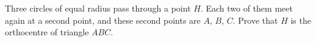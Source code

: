 Three circles of equal radius pass through a point $H$. Each two of them meet again at a second point, and these second points are $A$, $B$, $C$. Prove that $H$ is the orthocentre of triangle $ABC$.
